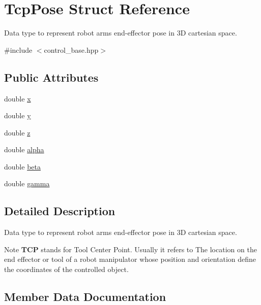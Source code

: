 \hypertarget{structTcpPose}{}\section{Tcp\+Pose Struct Reference}
\label{structTcpPose}


Data type to represent robot arm\textquotesingle{}s end-\/effector pose in 3D cartesian space.  




{\ttfamily \#include $<$control\+\_\+base.\+hpp$>$}

\subsection*{Public Attributes}
\begin{DoxyCompactItemize}
\item 
double \hyperlink{structTcpPose_ae394f2f7f9f51d60e868075712f87244}{x}
\item 
double \hyperlink{structTcpPose_a1050d339d788176b4323367a0150ad71}{y}
\item 
double \hyperlink{structTcpPose_a2c538c7a01a6950bcd9d6c2377f85ade}{z}
\item 
double \hyperlink{structTcpPose_ad9f0b5e0db1a7d559289180b1a046f63}{alpha}
\item 
double \hyperlink{structTcpPose_af07e5cf32da9710974e8b1eb3a654928}{beta}
\item 
double \hyperlink{structTcpPose_ae8efa3b9d6a4dfd78db315ffa28a23cc}{gamma}
\end{DoxyCompactItemize}


\subsection{Detailed Description}
Data type to represent robot arm\textquotesingle{}s end-\/effector pose in 3D cartesian space. 

\begin{DoxyNote}{Note}
{\bfseries T\+CP} stands for Tool Center Point. Usually it refers to The location on the end effector or tool of a robot manipulator whose position and orientation define the coordinates of the controlled object. 
\end{DoxyNote}


\subsection{Member Data Documentation}
\mbox{\label{structTcpPose_ad9f0b5e0db1a7d559289180b1a046f63}} 
